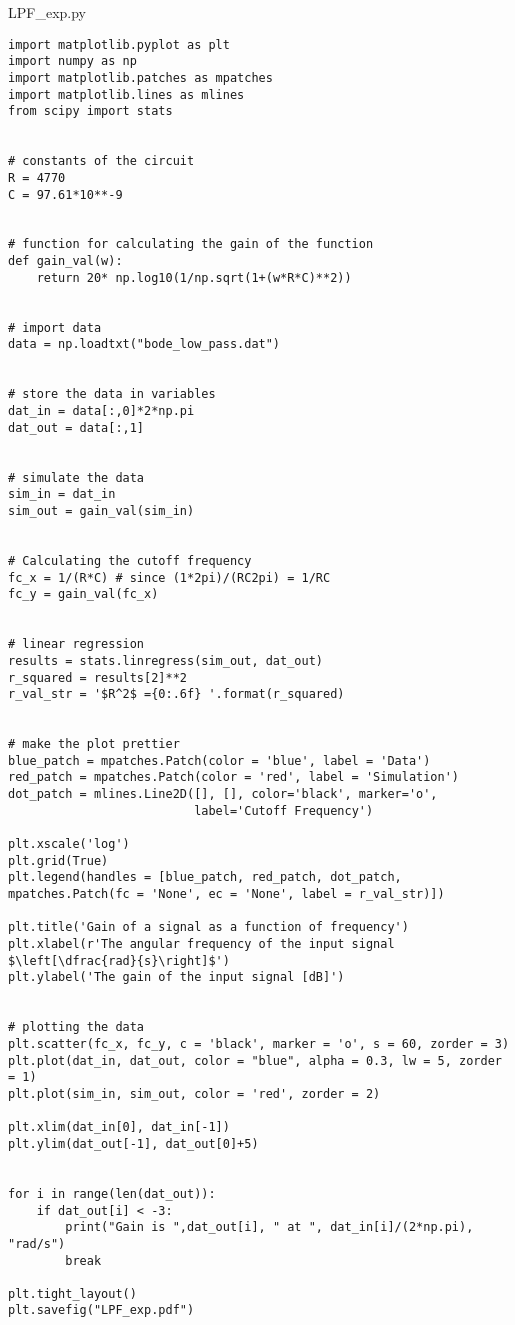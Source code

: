 \lstlistingname{ LPF\_exp.py}
\begin{lstlisting}[breaklines]
import matplotlib.pyplot as plt
import numpy as np
import matplotlib.patches as mpatches
import matplotlib.lines as mlines
from scipy import stats


# constants of the circuit
R = 4770
C = 97.61*10**-9


# function for calculating the gain of the function
def gain_val(w):
    return 20* np.log10(1/np.sqrt(1+(w*R*C)**2))


# import data
data = np.loadtxt("bode_low_pass.dat")


# store the data in variables
dat_in = data[:,0]*2*np.pi
dat_out = data[:,1]


# simulate the data
sim_in = dat_in
sim_out = gain_val(sim_in)


# Calculating the cutoff frequency
fc_x = 1/(R*C) # since (1*2pi)/(RC2pi) = 1/RC
fc_y = gain_val(fc_x)


# linear regression
results = stats.linregress(sim_out, dat_out)
r_squared = results[2]**2
r_val_str = '$R^2$ ={0:.6f} '.format(r_squared)


# make the plot prettier
blue_patch = mpatches.Patch(color = 'blue', label = 'Data')
red_patch = mpatches.Patch(color = 'red', label = 'Simulation')
dot_patch = mlines.Line2D([], [], color='black', marker='o',
                          label='Cutoff Frequency')

plt.xscale('log')
plt.grid(True)
plt.legend(handles = [blue_patch, red_patch, dot_patch, mpatches.Patch(fc = 'None', ec = 'None', label = r_val_str)])

plt.title('Gain of a signal as a function of frequency')    
plt.xlabel(r'The angular frequency of the input signal $\left[\dfrac{rad}{s}\right]$')
plt.ylabel('The gain of the input signal [dB]')


# plotting the data
plt.scatter(fc_x, fc_y, c = 'black', marker = 'o', s = 60, zorder = 3)
plt.plot(dat_in, dat_out, color = "blue", alpha = 0.3, lw = 5, zorder = 1)
plt.plot(sim_in, sim_out, color = 'red', zorder = 2)

plt.xlim(dat_in[0], dat_in[-1])
plt.ylim(dat_out[-1], dat_out[0]+5)


for i in range(len(dat_out)):
    if dat_out[i] < -3:
        print("Gain is ",dat_out[i], " at ", dat_in[i]/(2*np.pi), "rad/s")
        break

plt.tight_layout()
plt.savefig("LPF_exp.pdf")
\end{lstlisting}